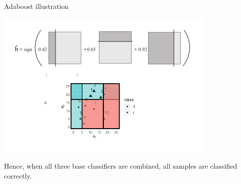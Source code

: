 \documentclass[11pt,compress,t,notes=noshow, xcolor=table]{beamer}
\begin{document}
\begin{vbframe}{Adaboost illustration}
\begin{center}
  \includegraphics[trim = 0 20 0 10, clip, width = 0.8\textwidth]{
  figure_man/adaboost_example_adjusted.png}
\end{center}

Hence, when all three base classifiers are combined, all samples are classified 
correctly.

\end{vbframe}










\end{document}
